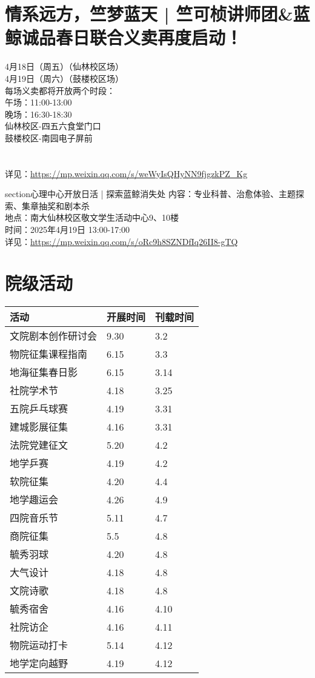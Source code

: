 \documentclass[letterpaper, 12pt]{article}
\begin{document}
\begin{multicols}{2}
\section{情系远方，竺梦蓝天 | 竺可桢讲师团\&蓝鲸诚品春日联合义卖再度启动！}
4月18日（周五）（仙林校区场）
\\4月19日（周六）（鼓楼校区场）
\\每场义卖都将开放两个时段：
\\午场：11:00-13:00
\\晚场：16:30-18:30
\\仙林校区-四五六食堂门口
\\鼓楼校区-南园电子屏前
\\
\\
\\详见：\url{https://mp.weixin.qq.com/s/weWyIsQHyNN9fjgzkPZ_Kg}

section{心理中心开放日活 | 探索蓝鲸消失处}
内容：专业科普、治愈体验、主题探索、集章抽奖和剧本杀
\\地点：南大仙林校区敬文学生活动中心9、10楼
\\时间：2025年4月19日 13:00-17:00
\\详见：\url{https://mp.weixin.qq.com/s/oRc9h8SZNDfIq26II8-gTQ}

\section{院级活动}
\begin{tabular}{|>{\centering\arraybackslash}m{}|m{}|m{}|}
\hline
    活动 & 开展时间 & 刊载时间\\
    \hline\hline
    文院剧本创作研讨会 & 9.30 & 3.2\\
    物院征集课程指南 & 6.15 & 3.3\\
    地海征集春日影 & 6.15 & 3.14\\
    社院学术节 & 4.18 & 3.25\\
    五院乒乓球赛 & 4.19 & 3.31\\
    建城影展征集 & 4.16 & 3.31\\
    法院党建征文 & 5.20 & 4.2\\
    地学乒赛 & 4.19 & 4.2\\
    软院征集 & 4.20 & 4.4\\
    地学趣运会 & 4.26 & 4.9\\
    四院音乐节 & 5.11 & 4.7\\
    商院征集 & 5.5 & 4.8\\
    毓秀羽球 & 4.20 & 4.8\\
    大气设计 & 4.18 & 4.8\\
    文院诗歌 & 4.18 & 4.8\\
    毓秀宿舍 & 4.16 & 4.10\\
    社院访企 & 4.16 & 4.11\\
    物院运动打卡 & 5.14 & 4.12\\
    地学定向越野 & 4.19 & 4.12\\
    \hline
\end{tabular}


\end{multicols}
\end{document}
